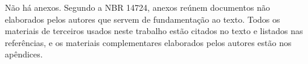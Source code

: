 \begin{anexosenv}
\partanexos

Não há anexos. Segundo a NBR 14724, anexos reúnem documentos não elaborados pelos autores que servem de fundamentação ao texto. Todos os materiais de terceiros usados neste trabalho estão citados no texto e listados nas referências, e os materiais complementares elaborados pelos autores estão nos apêndices.

\end{anexosenv}
